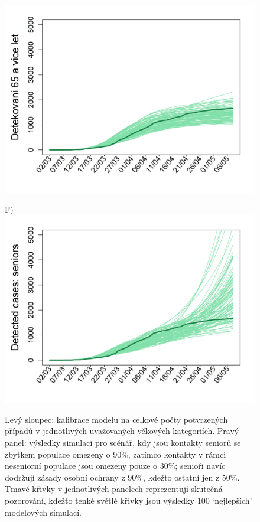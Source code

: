 \begin{figure}
\begin{center}
\begin{minipage}[m]{0.45\textwidth}
			\includegraphics[width = \textwidth]{pic/sc_bas_3.png}
		\end{minipage}
		\begin{minipage}[m]{0.45\textwidth}
			F) \\
			\includegraphics[width = \textwidth]{pic/sc_old90_30_3.png}
		\end{minipage}
	\end{center}
	\caption{Levý sloupec: kalibrace modelu na celkové počty potvrzených případů v jednotlivých uvažovaných věkových kategoriích. Pravý panel: výsledky simulací pro scénář, kdy jsou kontakty seniorů se zbytkem populace omezeny o 90\%, zatímco kontakty v rámci neseniorní populace jsou omezeny pouze o 30\%; senioři navíc dodržují zásady osobní ochrany z 90\%, kdežto ostatní jen z 50\%. Tmavé křivky v jednotlivých panelech reprezentují skutečná pozorování, kdežto tenké světlé křivky jsou výsledky 100 `nejlepších' modelových simulací.}
	\label{shelterning_seniors}
\end{figure}

